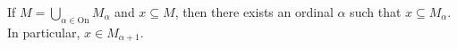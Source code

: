 If $M = \bigcup_{\alpha \in \mathrm{On}} M_\alpha$ and $x \subseteq M$, then there exists an ordinal $\alpha$ such that $x \subseteq M_\alpha$. In particular, $x \in M_{\alpha+1}$.
